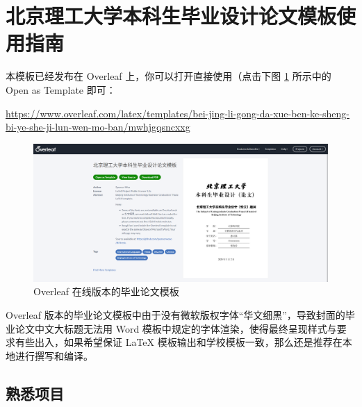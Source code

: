 \section{北京理工大学本科生毕业设计论文模板使用指南} \label{grad-thesis}


本模板已经发布在 Overleaf 上，你可以打开直接使用（点击下图 \ref{overleaf-grad-thesis} 所示中的 Open as Template 即可：

\begin{center}
  \color{ForestGreen}\href{https://www.overleaf.com/latex/templates/bei-jing-li-gong-da-xue-ben-ke-sheng-bi-ye-she-ji-lun-wen-mo-ban/mwhjgqsncxxg}{https://www.overleaf.com/latex/templates/bei-jing-li-gong-da-xue-ben-ke-sheng-bi-ye-she-ji-lun-wen-mo-ban/mwhjgqsncxxg}
\end{center}

\begin{figure}[H]
  \centering
  \includegraphics[width=\textwidth]{images/overleaf_grad_thesis.png}
  \caption{Overleaf 在线版本的毕业论文模板}
  \label{overleaf-grad-thesis}
\end{figure}

Overleaf 版本的毕业论文模板中由于没有微软版权字体“华文细黑”，导致封面的毕业论文中文大标题无法用 Word 模板中规定的字体渲染，使得最终呈现样式与要求有些出入，如果希望保证 {\LaTeX} 模板输出和学校模板一致，那么还是推荐在本地进行撰写和编译。

\subsection{熟悉项目}


